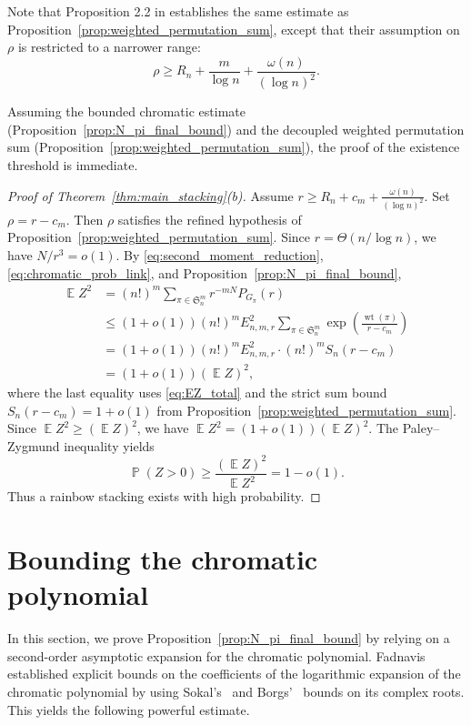 \documentclass[11pt,reqno]{amsart}
\theoremstyle{definition}
\theoremstyle{remark}
\newcommand\E{\operatorname{\mathbb{E}}}
\renewcommand\Pr{\operatorname{\mathbb{P}}}
\renewcommand\leq{\leqslant}
\renewcommand\geq{\geqslant}
\renewcommand\ge{\geqslant}
\newcommand{\wt}{\operatorname{wt}}
\begin{document}
Note that Proposition 2.2 in \cite{ADK} establishes the same estimate as Proposition~\ref{prop:weighted_permutation_sum}, except that their assumption on $\rho$ is restricted to a narrower range:
\[
\rho\ge R_n+\frac{m}{\log n}+\frac{\omega(n)}{(\log n)^2}.
\]



Assuming the bounded chromatic estimate (Proposition~\ref{prop:N_pi_final_bound}) and the decoupled weighted permutation sum (Proposition~\ref{prop:weighted_permutation_sum}), the proof of the existence threshold is immediate.

\begin{proof}[Proof of Theorem~\ref{thm:main_stacking}\textup{(b)}]
Assume $r\geq R_n+c_m+\frac{\omega(n)}{(\log n)^2}$. Set $\rho=r-c_m$. Then $\rho$ satisfies the refined hypothesis of Proposition~\ref{prop:weighted_permutation_sum}. Since $r=\Theta(n/\log n)$, we have $N/r^3=o(1)$. By \eqref{eq:second_moment_reduction}, \eqref{eq:chromatic_prob_link}, and Proposition~\ref{prop:N_pi_final_bound},
\begin{align*}
        \E Z^2
        &=(n!)^m\sum_{\pi\in\mathfrak S_n^m}r^{-mN}P_{G_\pi}(r)\\
        &\leq (1+o(1))(n!)^mE_{n,m,r}^2
        \sum_{\pi\in\mathfrak S_n^m}
        \exp\left(\frac{\wt(\pi)}{r-c_m}\right)\\
        &=(1+o(1))(n!)^mE_{n,m,r}^2\cdot (n!)^m S_n(r-c_m)\\
        &=(1+o(1))(\E Z)^2,
\end{align*}
where the last equality uses \eqref{eq:EZ_total} and the strict sum bound $S_n(r-c_m) = 1+o(1)$ from Proposition~\ref{prop:weighted_permutation_sum}.  Since $\E Z^2\geq(\E Z)^2$, we have $\E Z^2=(1+o(1))(\E Z)^2$. The Paley--Zygmund inequality yields 
$$\Pr(Z>0)\geq \frac{(\E Z)^2}{\E Z^2}=1-o(1).$$ 
Thus a rainbow stacking exists with high probability.
\end{proof}

\medskip

\section{Bounding the chromatic polynomial}\label{sec:bound_chromatic}

In this section, we prove Proposition~\ref{prop:N_pi_final_bound} by relying on a second-order asymptotic expansion for the chromatic polynomial. Fadnavis \cite{Fadnavis} established explicit bounds on the coefficients of the logarithmic expansion of the chromatic polynomial by using Sokal's~\cite{Sokal} and Borgs'~\cite{Borgs} bounds on its complex roots. This yields the following powerful estimate.
\end{document}
